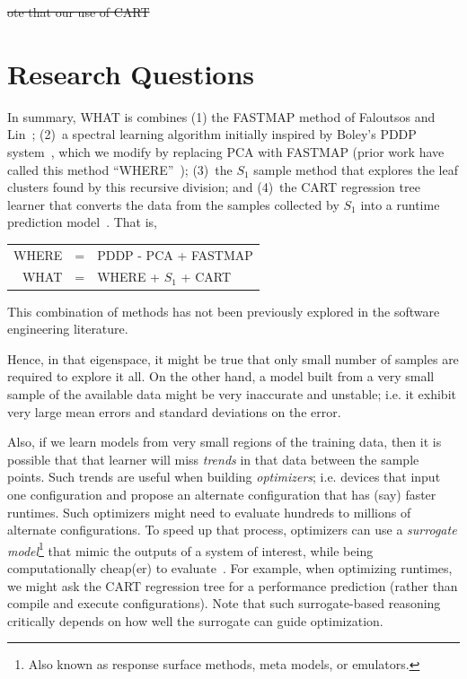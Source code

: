 \documentclass{sig-alternative}
\begin{document}
\st{ote that our use of CART }
\section{Research Questions} 
In summary, WHAT is combines
(1) the FASTMAP method of Faloutsos and Lin~\cite{Faloutsos1995};
(2)~a spectral learning algorithm initially   inspired by    Boley's PDDP system~\cite{boley98}, which we modify
by replacing  PCA with FASTMAP (prior work have called this
method ``WHERE''~\cite{me12d});
(3)~the $S_1$ sample method that explores the leaf clusters found by this recursive division;
and (4)~the CART regression tree learner that converts the data from the samples collected by $S_1$
into a runtime prediction model~\cite{breiman1984}.
That is,
\begin{center}
\begin{tabular}{rcl}
WHERE& = &PDDP - PCA + FASTMAP\\ 
WHAT& =  & WHERE + $S_1$ + CART
\end{tabular}
\end{center}
This combination of methods has not been previously explored in the
software engineering literature.


Hence, in that eigenspace, it might be true that only small
number of samples are required to explore it all.
On the other hand, a model built from a very small sample of the available data might
be very inaccurate and unstable; i.e. it exhibit very large mean errors and standard deviations on the error.

Also, if we learn models from very small regions of the training data,
then it is  possible that that learner will miss {\em trends} in that data
between the sample points. Such trends are useful when building {\em optimizers};
i.e. devices that input one configuration and propose an alternate
configuration that has (say) faster runtimes. Such optimizers might
need to evaluate hundreds to millions of alternate configurations. 
To speed up that process, optimizers can use a {\em surrogate model}\footnote{Also known as response surface methods, meta models, or emulators.}
that  mimic the outputs of a system of interest, while being computationally cheap(er) to evaluate~\cite{loshchilov13}. For example, when optimizing
runtimes, we might ask the CART regression tree for a performance
prediction (rather than compile and execute
configurations).  Note that such surrogate-based
reasoning critically depends on how well the surrogate can guide optimization.
\end{document}
